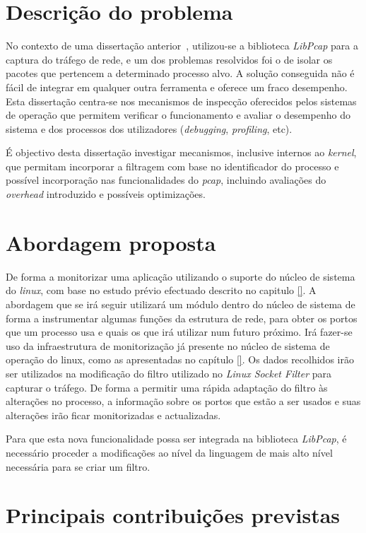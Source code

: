 \section{Descrição do problema} \label{sect:descricao_prob}
 No contexto de uma dissertação anterior~\cite{Farruca:2009}, utilizou-se a biblioteca \textit{LibPcap} para a captura do tráfego de rede, e um dos problemas resolvidos foi o de isolar os pacotes que pertencem a determinado processo alvo.
A solução conseguida não é fácil de integrar em qualquer outra ferramenta e oferece um fraco desempenho.
Esta dissertação centra-se nos mecanismos de inspecção oferecidos pelos sistemas de operação que permitem verificar o funcionamento e avaliar o desempenho do sistema e dos processos dos utilizadores (\textit{debugging}, \textit{profiling}, etc).

É objectivo desta dissertação investigar mecanismos, inclusive internos ao \textit{kernel}, que permitam incorporar a filtragem com base no identificador do processo e possível incorporação nas funcionalidades do \textit{pcap}, incluindo avaliações do \textit{overhead} introduzido e possíveis optimizações.

\section{Abordagem proposta}\label{sec:abordagem_proposta}
De forma a monitorizar uma aplicação utilizando o suporte do núcleo de sistema do \textit{linux}, com base no estudo prévio efectuado descrito no capitulo \ref{}.
A abordagem que se irá seguir utilizará um módulo dentro do núcleo de sistema de forma a instrumentar algumas funções da estrutura de rede, para obter os portos que um processo usa e quais os que irá utilizar num futuro próximo.
Irá fazer-se uso da infraestrutura de monitorização já presente no núcleo de sistema de operação do linux, como as apresentadas no capítulo \ref{}.
Os dados recolhidos irão ser utilizados na modificação do filtro utilizado no \textit{Linux Socket Filter} para capturar o tráfego.
De forma a permitir uma rápida adaptação do filtro às alterações no processo, a informação sobre os portos que estão a ser usados e suas alterações irão ficar monitorizadas e actualizadas.

Para que esta nova funcionalidade possa ser integrada na biblioteca \textit{LibPcap}, é necessário proceder a modificações ao nível da linguagem de mais alto nível necessária para se criar um filtro.

\section{Principais contribuições previstas} \label{sect:contribuicoes}

